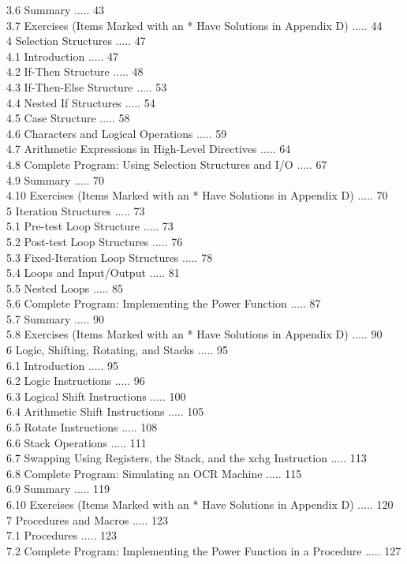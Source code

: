 \documentclass[10pt]{book}
\begin{document}
3.6 Summary ..... 43\\
3.7 Exercises (Items Marked with an * Have Solutions in Appendix D) ..... 44\\
4 Selection Structures ..... 47\\
4.1 Introduction ..... 47\\
4.2 If-Then Structure ..... 48\\
4.3 If-Then-Else Structure ..... 53\\
4.4 Nested If Structures ..... 54\\
4.5 Case Structure ..... 58\\
4.6 Characters and Logical Operations ..... 59\\
4.7 Arithmetic Expressions in High-Level Directives ..... 64\\
4.8 Complete Program: Using Selection Structures and I/O ..... 67\\
4.9 Summary ..... 70\\
4.10 Exercises (Items Marked with an * Have Solutions in Appendix D) ..... 70\\
5 Iteration Structures ..... 73\\
5.1 Pre-test Loop Structure ..... 73\\
5.2 Post-test Loop Structures ..... 76\\
5.3 Fixed-Iteration Loop Structures ..... 78\\
5.4 Loops and Input/Output ..... 81\\
5.5 Nested Loops ..... 85\\
5.6 Complete Program: Implementing the Power Function ..... 87\\
5.7 Summary ..... 90\\
5.8 Exercises (Items Marked with an * Have Solutions in Appendix D) ..... 90\\
6 Logic, Shifting, Rotating, and Stacks ..... 95\\
6.1 Introduction ..... 95\\
6.2 Logic Instructions ..... 96\\
6.3 Logical Shift Instructions ..... 100\\
6.4 Arithmetic Shift Instructions ..... 105\\
6.5 Rotate Instructions ..... 108\\
6.6 Stack Operations ..... 111\\
6.7 Swapping Using Registers, the Stack, and the xchg Instruction ..... 113\\
6.8 Complete Program: Simulating an OCR Machine ..... 115\\
6.9 Summary ..... 119\\
6.10 Exercises (Items Marked with an * Have Solutions in Appendix D) ..... 120\\
7 Procedures and Macros ..... 123\\
7.1 Procedures ..... 123\\
7.2 Complete Program: Implementing the Power Function in a Procedure ..... 127\\
\end{document}
